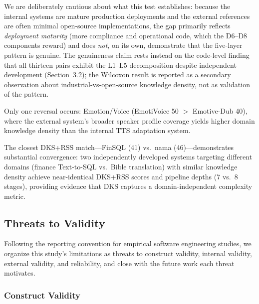 \documentclass[fleqn,10pt,lineno]{wlpeerj}
\begin{document}
We are deliberately cautious about what this test establishes: because the internal systems are mature production deployments and the external references are often minimal open-source implementations, the gap primarily reflects \textit{deployment maturity} (more compliance and operational code, which the D6--D8 components reward) and does \textit{not}, on its own, demonstrate that the five-layer pattern is genuine. The genuineness claim rests instead on the code-level finding that all thirteen pairs exhibit the L1--L5 decomposition despite independent development (Section~3.2); the Wilcoxon result is reported as a secondary observation about industrial-vs-open-source knowledge density, not as validation of the pattern.

Only one reversal occurs: Emotion/Voice (EmotiVoice 50 $>$ Emotive-Dub 40), where the external system's broader speaker profile coverage yields higher domain knowledge density than the internal TTS adaptation system.

The closest DKS+RSS match---FinSQL (41) vs.\ nama (46)---demonstrates substantial convergence: two independently developed systems targeting different domains (finance Text-to-SQL vs.\ Bible translation) with similar knowledge density achieve near-identical DKS+RSS scores and pipeline depths (7 vs.\ 8 stages), providing evidence that DKS captures a domain-independent complexity metric.


\subsection{Threats to Validity}
\label{sec:limitations}

Following the reporting convention for empirical software engineering studies, we organize this study's limitations as threats to construct validity, internal validity, external validity, and reliability, and close with the future work each threat motivates.

\subsubsection{Construct Validity}
\end{document}
